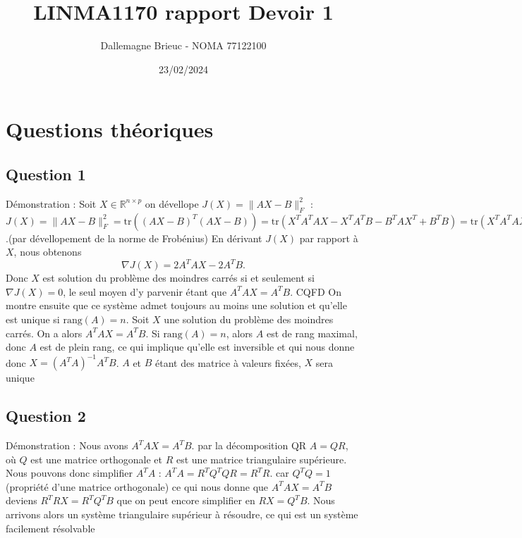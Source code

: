 \documentclass[11pt]{article}
\title{LINMA1170 rapport Devoir 1}
\author{Dallemagne Brieuc - NOMA 77122100}
\date{23/02/2024}
\begin{document}
\maketitle

\section{Questions théoriques}

\subsection{Question 1}

Démonstration : Soit \( X \in \mathbb{R}^{n \times p} \) on dévellope \( J(X) = \lVert AX - B\rVert^2_F\) :  \( J(X) = \lVert AX - B \rVert^2_F = \text{tr}((AX - B)^T (AX - B)) =
\text{tr}(X^T A^T AX - X^T A^T B - B^T A X^T + B^T B) = \text{tr}(X^T A^T AX - 2X^T A^T B + B^T B) \).(par dévellopement de la norme de Frobénius) En dérivant \( J(X) \) par rapport à \( X \), 
nous obtenons
\[ \nabla J(X) = 2A^T AX - 2A^T B. \]
Donc \( X \) est solution du problème des moindres carrés si et seulement si \( \nabla J(X) = 0 \), le seul moyen d'y parvenir étant que  \( A^T AX = A^T B \). CQFD
\newline
On montre ensuite que ce système admet toujours au moins une solution et qu'elle est unique si \( \text{rang}(A) = n \). 
\newline
Soit \( X \) une solution du problème des moindres carrés. On a alors \( A^T AX = A^T B \). Si \( \text{rang}(A) = n \), alors \( A \) est de rang maximal, donc \( A \) est de plein rang, ce qui implique qu'elle est inversible et qui nous donne donc \( X = (A^T A)^{-1}A^T B \).  \( A \) et \( B \) étant des matrice à valeurs fixées, \( X \) sera unique

\subsection{Question 2}

Démonstration : Nous avons \( A^T AX = A^T B \). par la décomposition QR \( A = QR \), où \( Q \) est une matrice orthogonale et \( R \) est une matrice triangulaire supérieure.
Nous pouvons donc simplifier \( A^T A\) :  \( A^T A = R^T Q^T QR = R^T R \). car \(Q^T Q = 1\) (propriété d'une matrice orthogonale)  ce qui nous donne que \( A^T AX = A^T B \) deviens \( R^T RX = R^T Q^T B \) que on peut encore simplifier en \( RX = Q^T B \). 
Nous arrivons alors un système triangulaire supérieur à résoudre, ce qui est un système facilement résolvable 
\end{document}
